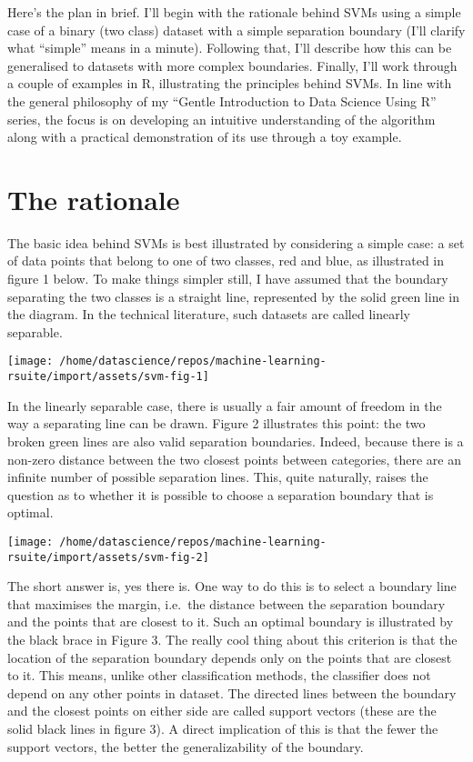 \documentclass[]{book}
\begin{document}
Here's the plan in brief. I'll begin with the rationale behind SVMs using a simple case of a binary (two class) dataset with a simple separation boundary (I'll clarify what ``simple'' means in a minute). Following that, I'll describe how this can be generalised to datasets with more complex boundaries. Finally, I'll work through a couple of examples in R, illustrating the principles behind SVMs. In line with the general philosophy of my ``Gentle Introduction to Data Science Using R'' series, the focus is on developing an intuitive understanding of the algorithm along with a practical demonstration of its use through a toy example.

\hypertarget{the-rationale}{%
\section{The rationale}\label{the-rationale}}

The basic idea behind SVMs is best illustrated by considering a simple case: a set of data points that belong to one of two classes, red and blue, as illustrated in figure 1 below. To make things simpler still, I have assumed that the boundary separating the two classes is a straight line, represented by the solid green line in the diagram. In the technical literature, such datasets are called linearly separable.

\begin{center}\texttt{[image: /home/datascience/repos/machine-learning-rsuite/import/assets/svm-fig-1]} \end{center}

In the linearly separable case, there is usually a fair amount of freedom in the way a separating line can be drawn. Figure 2 illustrates this point: the two broken green lines are also valid separation boundaries. Indeed, because there is a non-zero distance between the two closest points between categories, there are an infinite number of possible separation lines. This, quite naturally, raises the question as to whether it is possible to choose a separation boundary that is optimal.

\begin{center}\texttt{[image: /home/datascience/repos/machine-learning-rsuite/import/assets/svm-fig-2]} \end{center}

The short answer is, yes there is. One way to do this is to select a boundary line that maximises the margin, i.e.~the distance between the separation boundary and the points that are closest to it. Such an optimal boundary is illustrated by the black brace in Figure 3. The really cool thing about this criterion is that the location of the separation boundary depends only on the points that are closest to it. This means, unlike other classification methods, the classifier does not depend on any other points in dataset. The directed lines between the boundary and the closest points on either side are called support vectors (these are the solid black lines in figure 3). A direct implication of this is that the fewer the support vectors, the better the generalizability of the boundary.
\end{document}
